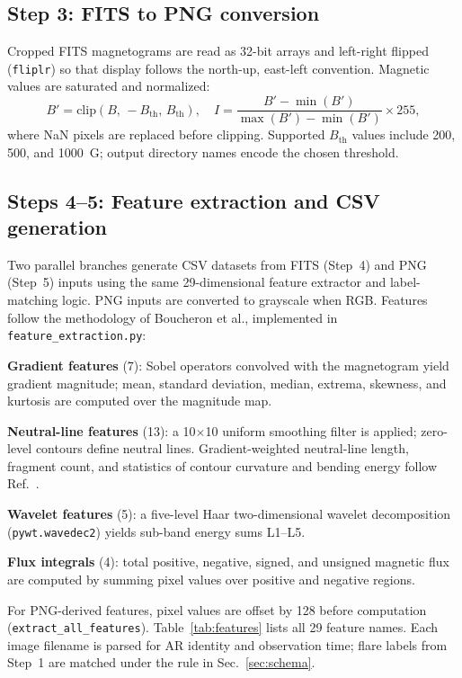 \documentclass[]{spie}
\begin{document}
\subsection{Step 3: FITS to PNG conversion}

Cropped FITS magnetograms are read as 32-bit arrays and left-right flipped (\texttt{fliplr}) so that display follows the north-up, east-left convention. Magnetic values are saturated and normalized:
\begin{equation}
B' = \mathrm{clip}(B,\,-B_{\mathrm{th}},\,B_{\mathrm{th}}), \quad
I = \frac{B' - \min(B')}{\max(B') - \min(B')} \times 255,
\label{eq:norm}
\end{equation}
where NaN pixels are replaced before clipping. Supported $B_{\mathrm{th}}$ values include 200, 500, and 1000~G; output directory names encode the chosen threshold.

\subsection{Steps 4--5: Feature extraction and CSV generation}

Two parallel branches generate CSV datasets from FITS (Step~4) and PNG (Step~5) inputs using the same 29-dimensional feature extractor and label-matching logic. PNG inputs are converted to grayscale when RGB. Features follow the methodology of Boucheron et al.,\cite{Boucheron2015} implemented in \texttt{feature\_extraction.py}:

\textbf{Gradient features} (7): Sobel operators convolved with the magnetogram yield gradient magnitude; mean, standard deviation, median, extrema, skewness, and kurtosis are computed over the magnitude map.

\textbf{Neutral-line features} (13): a 10$\times$10 uniform smoothing filter is applied; zero-level contours define neutral lines. Gradient-weighted neutral-line length, fragment count, and statistics of contour curvature and bending energy follow Ref.~.

\textbf{Wavelet features} (5): a five-level Haar two-dimensional wavelet decomposition (\texttt{pywt.wavedec2}) yields sub-band energy sums L1--L5.

\textbf{Flux integrals} (4): total positive, negative, signed, and unsigned magnetic flux are computed by summing pixel values over positive and negative regions.

For PNG-derived features, pixel values are offset by 128 before computation (\texttt{extract\_all\_features}). Table~\ref{tab:features} lists all 29 feature names. Each image filename is parsed for AR identity and observation time; flare labels from Step~1 are matched under the rule in Sec.~\ref{sec:schema}.
\end{document}
